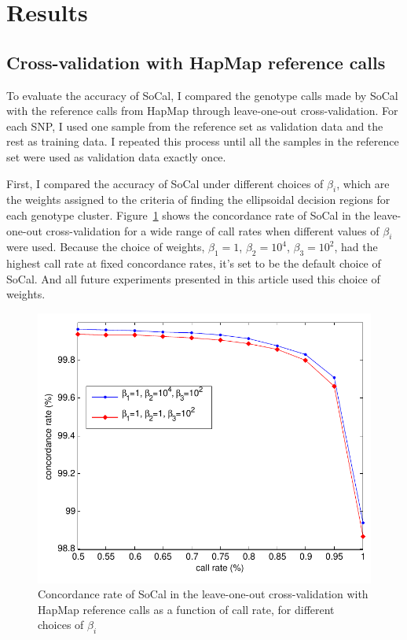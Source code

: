 \documentclass{scrartcl}
\begin{document}
\section{Results}

\subsection{Cross-validation with HapMap reference calls}

\par
To evaluate the accuracy of SoCal, I compared the genotype calls made by SoCal
with the reference calls from HapMap through leave-one-out
cross-validation.
For each SNP, I used one sample from the reference set as validation data and
the rest as training data.
I repeated this process until all the samples in the reference set were used
as validation data exactly once.

\par
First, I compared the accuracy of SoCal under different choices of $\beta_i$,
which are the weights assigned to the criteria of finding the ellipsoidal
decision regions for each genotype cluster.
Figure~\ref{fig:result_sh_crvacc} shows the concordance rate of SoCal in the
leave-one-out cross-validation for a wide range of call rates when different
values of $\beta_i$ were used.
Because the choice of weights, $\beta_1=1$, $\beta_2=10^4$, $\beta_3=10^2$,
had the highest call rate at fixed concordance rates, it's set to be the
default choice of SoCal.
And all future experiments presented in this article used this choice
of weights.

\begin{figure}[H]
\centering
\includegraphics[scale=0.75]
{result_figs/cmp_socal_hapmap/cmp_socal_hapmap_cr_vs_acc.pdf}
\caption{Concordance rate of SoCal in the leave-one-out cross-validation with
HapMap reference calls as a function of call rate, for different choices of
$\beta_i$}
\label{fig:result_sh_crvacc}
\end{figure}
\end{document}
